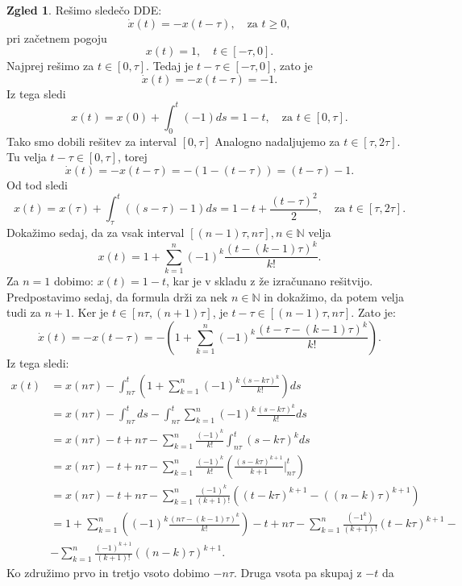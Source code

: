 \documentclass[12pt,a4paper]{amsart}
\theoremstyle{definition} %
\newtheorem{zgled}[definicija]{Zgled}
\theoremstyle{plain} %
\newcommand{\N}{\mathbb N}
\begin{document}
\begin{zgled}
    Rešimo sledečo DDE:
    \[\dot{x}(t)=-x(t-\tau), \quad \text{za } t \geq 0,\]
    pri začetnem pogoju \[x(t)=1, \quad t \in [-\tau,0].\]
    Najprej rešimo za $t \in [0,\tau]$. Tedaj je $t-\tau \in [-\tau,0]$, zato je
    \[\dot{x}(t)=-x(t-\tau)=-1.\]
    Iz tega sledi
    \[x(t)=x(0)+ \int_{0}^{t}(-1)ds = 1-t, \quad \text{za } t \in [0,\tau].\]
    Tako smo dobili rešitev za interval $[0,\tau]$
    Analogno nadaljujemo za $t \in [\tau, 2\tau]$. Tu velja $t-\tau \in [0,\tau]$, torej
    \[\dot{x}(t)=-x(t-\tau)=-(1-(t-\tau))=(t-\tau)-1.\]
    Od tod sledi
    \[x(t)=x(\tau)+\int_{\tau}^{t}((s-\tau)-1)ds=1-t+\frac{(t-\tau)^2}{2},\quad \text{za }t\in[\tau,2\tau].\]
    Dokažimo sedaj, da za vsak interval $[(n-1)\tau,n\tau], n\in \N$ velja
    \[x(t)=1+\sum_{k=1}^{n}(-1)^k\frac{(t-(k-1)\tau)^k}{k!}.\]
    Za $n=1$ dobimo: $x(t)=1-t$, kar je v skladu z že izračunano rešitvijo.
    Predpostavimo sedaj, da formula drži za nek $n \in \N$ in dokažimo, da potem velja tudi za $n+1$.
    Ker je $t \in [n\tau,(n+1)\tau]$, je $t-\tau \in [(n-1)\tau, n\tau]$. Zato je:
    \[ \dot{x}(t)=-x(t-\tau)=-\left(1+\sum_{k=1}^{n}(-1)^k\frac{(t-\tau-(k-1)\tau)^k}{k!}\right).\]
    Iz tega sledi:
    \begin{equation*}
    \begin{split}
        x(t) &= x(n\tau) - \int_{n\tau}^{t}\left(1+\sum_{k=1}^{n}(-1)^k\frac{(s-k\tau)^k}{k!}\right)ds \\
        & = x(n\tau) - \int_{n\tau}^{t}ds - \int_{n\tau}^{t}\sum_{k=1}^{n}(-1)^k\frac{(s-k\tau)^k}{k!}ds \\
        & = x(n\tau) - t + n\tau - \sum_{k=1}^{n}\frac{(-1)^k}{k!}\int_{n\tau}^{t}(s-k\tau)^{k}ds \\
        & = x(n\tau) - t + n\tau - \sum_{k=1}^{n}\frac{(-1)^k}{k!}\left(\frac{(s-k\tau)^{k+1}}{k+1}\Bigr|_{n\tau}^{t}\right) \\
        & = x(n\tau) - t + n\tau - \sum_{k=1}^{n}\frac{(-1)^k}{(k+1)!}\left((t-k\tau)^{k+1}-((n-k)\tau)^{k+1}\right) \\
        & = 1 + \sum_{k=1}^{n}\left((-1)^k\frac{(n\tau-(k-1)\tau)^k}{k!}\right)- t + n\tau - \sum_{k=1}^{n}\frac{(-1^k)}{(k+1)!}
        (t-k\tau)^{k+1} - \\
        &- \sum_{k=1}^{n}\frac{(-1)^{k+1}}{(k+1)!}((n-k)\tau)^{k+1}.
    \end{split}      
    \end{equation*}
    Ko združimo prvo in tretjo vsoto dobimo $-n\tau$. Druga vsota pa skupaj z $-t$ da

\end{zgled}
\end{document}
